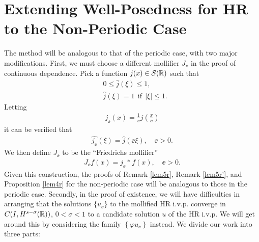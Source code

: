 \section{Extending Well-Posedness for HR to the Non-Periodic Case}
\label{sec:defs}
The method will be analogous to that of the periodic case, with two major
modifications. First, we must choose a different mollifier $J_\ee$ in the
proof of continuous dependence. Pick a
function $j(x) \in \mathcal{S}(\mathbb{R})$ such that
\begin{equation*}
		\begin{split}
			& 0 \le \widehat{j}(\xi) \le 1,
			\\
			& \widehat{j}(\xi) = 1 \ \ \text{if} \ \ |\xi| \le 1.
		\end{split}
	\end{equation*}
Letting
\begin{equation*}
	\begin{split}
		j_\ee(x) = \frac{1}{\ee} j \left (\frac{x}{\ee} \right )
	\end{split}
\end{equation*}
it can be verified that 
		\begin{equation*}
		\begin{split}
			\widehat{j_\ee}(\xi) = \widehat{j }(\ee \xi), \quad \ee > 0.
		\end{split}
	\end{equation*}
We then define $J_\ee$ to be the ``Friedrichs mollifier''
	\begin{equation*}
		\begin{split}
			J_\ee f(x) = j_\ee * f(x), \quad \ee>0.
		\end{split}
	\end{equation*}
Given this construction, the proofs of Remark \ref{lem5r}, Remark
\ref{lem5r'}, and Proposition \ref{lem4r} for the non-periodic case will be
analogous to those in the periodic case.
Secondly, in the proof of existence, we will have difficulties in arranging
that the solutions $\{u_\ee\}$ to the mollified HR i.v.p. converge in $C(I,
H^{s- \sigma}(\mathbb{R}))$, $0 < \sigma < 1$ to a candidate solution $u$ of the HR
i.v.p. We will get around this by considering the family $\left\{ \varphi
u_\ee \right\}$ instead.
%
%
%
%
We divide our work into three parts:
